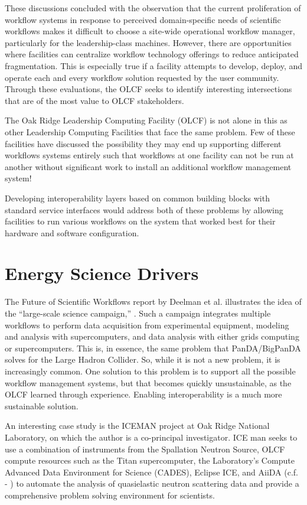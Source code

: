 \begin{displayquote}
These discussions concluded with the observation that the current proliferation
of workflow systems in response to perceived domain-specific needs of 
scientific workflows makes it difficult to choose a site-wide operational
workflow manager, particularly for the leadership-class machines. However,
there are opportunities where facilities can centralize workflow technology 
offerings to reduce anticipated fragmentation. This is especially true if a 
facility attempts to develop, deploy, and operate each and every workflow 
solution requested by the user community. Through these evaluations, the OLCF
seeks to identify interesting intersections that are of the most value to OLCF
stakeholders.
\end{displayquote}

The Oak Ridge Leadership Computing Facility (OLCF) is not alone in this
as other Leadership Computing Facilities that face the same problem. Few
of these facilities have discussed the possibility they may end up
supporting different workflows systems entirely such that workflows at
one facility can not be run at another without significant work to
install an additional workflow management system!

Developing interoperability layers based on common building blocks with
standard service interfaces would address both of these problems by
allowing facilities to run various workflows on the system that worked
best for their hardware and software configuration.

\section{Energy Science Drivers}\label{energy-science-drivers}

The Future of Scientific Workflows report by Deelman et al. illustrates
the idea of the ``large-scale science campaign,'' \cite{deelman_future_2015}.
Such a campaign integrates multiple workflows to perform data
acquisition from experimental equipment, modeling and analysis with
supercomputers, and data analysis with either grids computing or
supercomputers. This is, in essence, the same problem that
PanDA/BigPanDA solves for the Large Hadron Collider. So, while it is not
a new problem, it is increasingly common. One solution to this problem
is to support all the possible workflow management systems, but that
becomes quickly unsustainable, as the OLCF learned through experience.
Enabling interoperability is a much more sustainable solution.

An interesting case study is the ICEMAN project at Oak Ridge National
Laboratory, on which the author is a co-principal investigator. ICE man
seeks to use a combination of instruments from the Spallation Neutron
Source, OLCF compute resources such as the Titan supercomputer, the
Laboratory's Compute Advanced Data Environment for Science (CADES),
Eclipse ICE, and AiiDA (c.f. - \cite{pizzi_aiida:_2016}) to automate the
analysis of quasielastic neutron scattering data and provide a
comprehensive problem solving environment for scientists.
